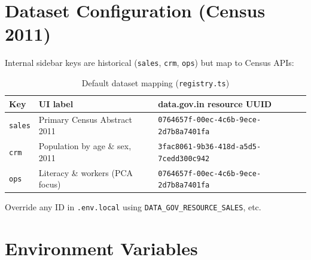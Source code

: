 \documentclass[11pt,a4paper]{article}
\begin{document}
\section{Dataset Configuration (Census 2011)}

Internal sidebar keys are historical (\texttt{sales}, \texttt{crm}, \texttt{ops}) but map to Census APIs:

\begin{table}[h]
\centering
\begin{tabular}{@{}lll@{}}
\toprule
\textbf{Key} & \textbf{UI label} & \textbf{data.gov.in resource UUID} \\
\midrule
\texttt{sales} & Primary Census Abstract 2011 & \texttt{0764657f-00ec-4c6b-9ece-2d7b8a7401fa} \\
\texttt{crm} & Population by age \& sex, 2011 & \texttt{3fac8061-9b36-418d-a5d5-7cedd300c942} \\
\texttt{ops} & Literacy \& workers (PCA focus) & \texttt{0764657f-00ec-4c6b-9ece-2d7b8a7401fa} \\
\bottomrule
\end{tabular}
\caption{Default dataset mapping (\texttt{registry.ts})}
\end{table}

Override any ID in \texttt{.env.local} using \texttt{DATA\_GOV\_RESOURCE\_SALES}, etc.

\section{Environment Variables}
\end{document}
